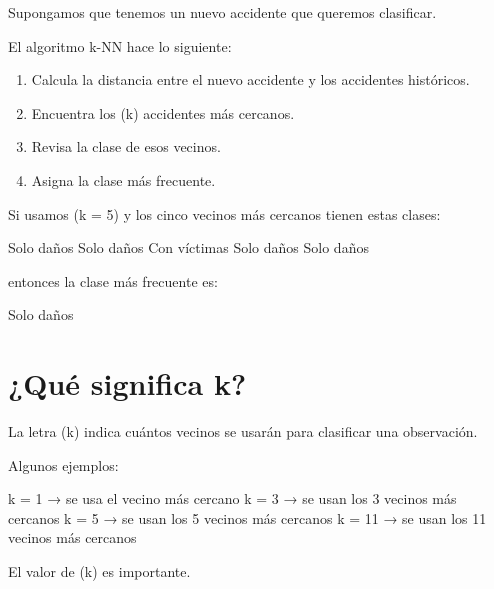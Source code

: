\documentclass[
  11pt,
  letterpaper,
]{book}
\newenvironment{Shaded}{\begin{snugshade}}{\end{snugshade}}
\newcommand{\NormalTok}[1]{\textcolor[rgb]{0.00,0.23,0.31}{#1}}
\providecommand{\tightlist}{%
  \setlength{\itemsep}{0pt}\setlength{\parskip}{0pt}}
\begin{document}
Supongamos que tenemos un nuevo accidente que queremos clasificar.

El algoritmo k-NN hace lo siguiente:

\begin{enumerate}
\def\labelenumi{\arabic{enumi}.}
\tightlist
\item
  Calcula la distancia entre el nuevo accidente y los accidentes
  históricos.
\item
  Encuentra los (k) accidentes más cercanos.
\item
  Revisa la clase de esos vecinos.
\item
  Asigna la clase más frecuente.
\end{enumerate}

Si usamos (k = 5) y los cinco vecinos más cercanos tienen estas clases:

\begin{Shaded}
\begin{Highlighting}[]
\NormalTok{Solo daños}
\NormalTok{Solo daños}
\NormalTok{Con víctimas}
\NormalTok{Solo daños}
\NormalTok{Solo daños}
\end{Highlighting}
\end{Shaded}

entonces la clase más frecuente es:

\begin{Shaded}
\begin{Highlighting}[]
\NormalTok{Solo daños}
\end{Highlighting}
\end{Shaded}

\section{¿Qué significa k?}\label{quuxe9-significa-k}

La letra (k) indica cuántos vecinos se usarán para clasificar una
observación.

Algunos ejemplos:

\begin{Shaded}
\begin{Highlighting}[]
\NormalTok{k = 1   → se usa el vecino más cercano}
\NormalTok{k = 3   → se usan los 3 vecinos más cercanos}
\NormalTok{k = 5   → se usan los 5 vecinos más cercanos}
\NormalTok{k = 11  → se usan los 11 vecinos más cercanos}
\end{Highlighting}
\end{Shaded}

El valor de (k) es importante.
\end{document}
